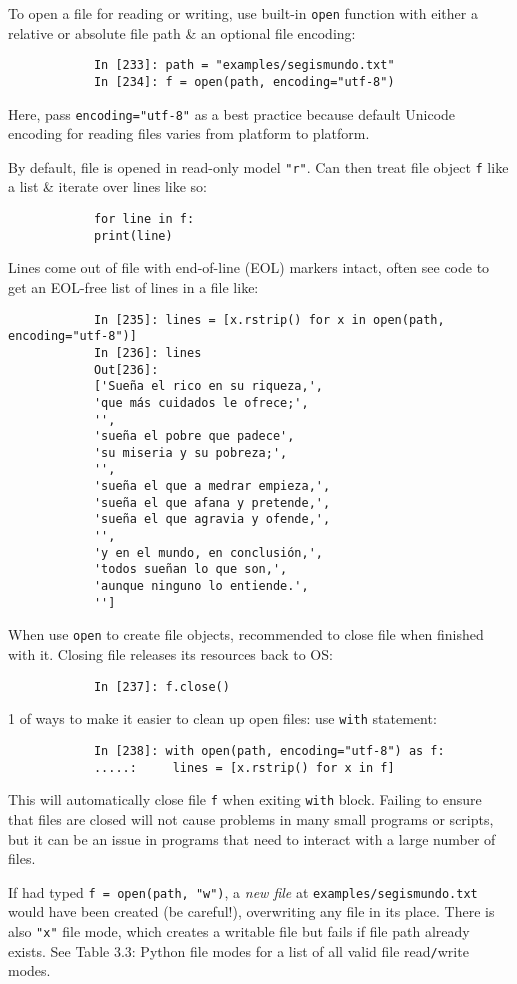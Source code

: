 \documentclass{article}
\begin{document}
\begin{itemize}
\begin{itemize}
		To open a file for reading or writing, use built-in {\tt open} function with either a relative or absolute file path \& an optional file encoding:
		\begin{verbatim}
			In [233]: path = "examples/segismundo.txt"
			In [234]: f = open(path, encoding="utf-8")
		\end{verbatim}
		Here, pass {\tt encoding="utf-8"} as a best practice because default Unicode encoding for reading files varies from platform to platform.
		
		By default, file is opened in read-only model {\tt"r"}. Can then treat file object {\tt f} like a list \& iterate over lines like so:
		\begin{verbatim}
			for line in f:
			print(line)
		\end{verbatim}
		Lines come out of file with end-of-line (EOL) markers intact, often see code to get an EOL-free list of lines in a file like:
		\begin{verbatim}
			In [235]: lines = [x.rstrip() for x in open(path, encoding="utf-8")]
			In [236]: lines
			Out[236]:
			['Sueña el rico en su riqueza,',
			'que más cuidados le ofrece;',
			'',
			'sueña el pobre que padece',
			'su miseria y su pobreza;',
			'',
			'sueña el que a medrar empieza,',
			'sueña el que afana y pretende,',
			'sueña el que agravia y ofende,',
			'',
			'y en el mundo, en conclusión,',
			'todos sueñan lo que son,',
			'aunque ninguno lo entiende.',
			'']
		\end{verbatim}
		When use {\tt open} to create file objects, recommended to close file when finished with it. Closing file releases its resources back to OS:
		\begin{verbatim}
			In [237]: f.close()
		\end{verbatim}
		1 of ways to make it easier to clean up open files: use {\tt with} statement:
		\begin{verbatim}
			In [238]: with open(path, encoding="utf-8") as f:
			.....:     lines = [x.rstrip() for x in f]
		\end{verbatim}
		This will automatically close file {\tt f} when exiting {\tt with} block. Failing to ensure that files are closed will not cause problems in many small programs or scripts, but it can be an issue in programs that need to interact with a large number of files.
		
		If had typed {\tt f = open(path, "w")}, a {\it new file} at {\tt examples/segismundo.txt} would have been created (be careful!), overwriting any file in its place. There is also {\tt"x"} file mode, which creates a writable file but fails if file path already exists. See {\sf Table 3.3: Python file modes} for a list of all valid file read{\tt/}write modes.
		

\end{itemize}
\end{itemize}
\end{document}
